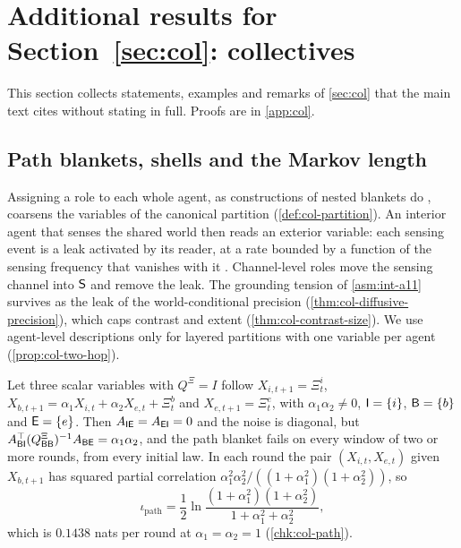 \section{Additional results for \texorpdfstring{Section~\ref{sec:col}}{Section 4}: collectives}\label{sup:col}

This section collects statements, examples and remarks of \cref{sec:col} that the main text cites without stating in full. Proofs are in \cref{app:col}.

\subsection{Path blankets, shells and the Markov length}\label{sup:col-path-blankets-shells-and-the-markov-leng}

\begin{remark}\label{rem:col-agent-level}
Assigning a role to each whole agent, as constructions of nested blankets do \citep{kirchhoff2018markov,palacios2020markov}, coarsens the variables of the canonical partition (\cref{def:col-partition}). An interior agent that senses the shared world then reads an exterior variable: each sensing event is a leak activated by its reader, at a rate bounded by a function of the sensing frequency that vanishes with it \citep{dennis2026communicating}. Channel-level roles move the sensing channel into $\mathsf{S}$ and remove the leak. The grounding tension of \cref{asm:int-a11} survives as the leak of the world-conditional precision (\cref{thm:col-diffusive-precision}), which caps contrast and extent (\cref{thm:col-contrast-size}). We use agent-level descriptions only for layered partitions with one variable per agent (\cref{prop:col-two-hop}).
\end{remark}

\begin{example}\label{ex:col-collider}
Let three scalar variables with $Q^{\Xi}=I$ follow $X_{i,t+1}=\Xi^i_t$, $X_{b,t+1}=\alpha_1X_{i,t}+\alpha_2X_{e,t}+\Xi^b_t$ and $X_{e,t+1}=\Xi^e_t$, with $\alpha_1\alpha_2\neq0$, $\mathsf{I}=\{i\}$, $\mathsf{B}=\{b\}$ and $\mathsf{E}=\{e\}$. Then $A_{\mathsf{I}\mathsf{E}}=A_{\mathsf{E}\mathsf{I}}=0$ and the noise is diagonal, but $A_{\mathsf{B}\mathsf{I}}^\top(Q^{\Xi}_{\mathsf{B}\mathsf{B}})^{-1}A_{\mathsf{B}\mathsf{E}}=\alpha_1\alpha_2$, and the path blanket fails on every window of two or more rounds, from every initial law. In each round the pair $(X_{i,t},X_{e,t})$ given $X_{b,t+1}$ has squared partial correlation $\alpha_1^2\alpha_2^2/((1+\alpha_1^2)(1+\alpha_2^2))$, so
\begin{equation}\label{eq:col-collider}
\iota_{\mathrm{path}}=\frac12\ln\frac{(1+\alpha_1^2)(1+\alpha_2^2)}{1+\alpha_1^2+\alpha_2^2},
\end{equation}
which is $0.1438$ nats per round at $\alpha_1=\alpha_2=1$ (\cref{chk:col-path}).
\end{example}

